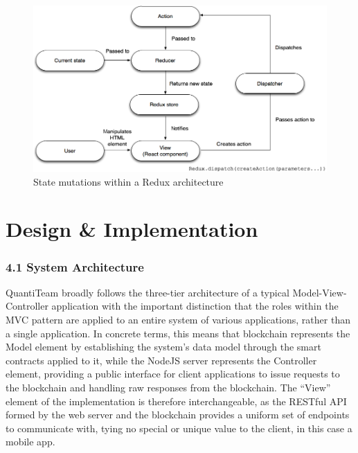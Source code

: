 \documentclass[12pt]{report}
\begin{document}
\begin{figure}[htbp]
\centering
\includegraphics{../diagrams/redux.png}
\caption{State mutations within a Redux architecture\cite{1reduxibm}}
\end{figure}

\clearpage

\chapter{Design \& Implementation}

\subsection{4.1 System Architecture}\label{system-architecture}

QuantiTeam broadly follows the three-tier architecture of a typical
Model-View-Controller\cite{krasner1988description} application with the important distinction that the
roles within the MVC pattern are applied to an entire system of various
applications, rather than a single application. In concrete terms, this
means that blockchain represents the Model element by establishing the
system's data model through the smart contracts applied to it, while the
NodeJS server represents the Controller element, providing a public
interface for client applications to issue requests to the blockchain
and handling raw responses from the blockchain. The ``View'' element of
the implementation is therefore interchangeable, as the RESTful API
formed by the web server and the blockchain provides a uniform set of
endpoints to communicate with, tying no special or unique value to the
client, in this case a mobile app.
\end{document}
